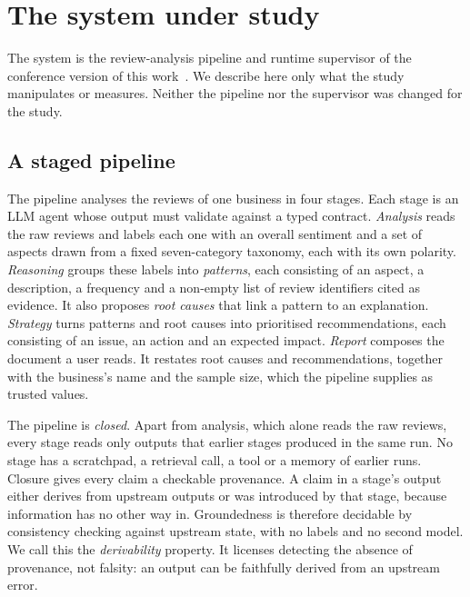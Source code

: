 \section{The system under study}
\label{sec:system}

The system is the review-analysis pipeline and runtime supervisor of the
conference version of this work~\citep{hoang2026eas}. We describe here only what
the study manipulates or measures. Neither the pipeline nor the supervisor was
changed for the study.

\subsection{A staged pipeline}
\label{sec:system-pipeline}

The pipeline analyses the reviews of one business in four stages. Each stage is
an LLM agent whose output must validate against a typed contract.
\emph{Analysis} reads the raw reviews and labels each one with an overall
sentiment and a set of aspects drawn from a fixed seven-category taxonomy,
each with its own polarity. \emph{Reasoning} groups these labels into
\emph{patterns}, each consisting of an aspect, a description, a frequency and
a non-empty list of review identifiers cited as evidence. It also proposes
\emph{root causes} that link a pattern to an explanation. \emph{Strategy} turns
patterns and root causes into prioritised recommendations, each consisting of
an issue, an action and an expected impact. \emph{Report} composes the
document a user reads. It restates root causes and recommendations, together
with the business's name and the sample size, which the pipeline supplies as
trusted values.

The pipeline is \emph{closed}. Apart from analysis, which alone reads the raw
reviews, every stage reads only outputs that earlier stages produced in the
same run. No stage has a scratchpad, a retrieval call, a tool or a memory of
earlier runs. Closure gives every claim a checkable provenance. A claim in a
stage's output either derives from upstream outputs or was introduced by that
stage, because information has no other way in. Groundedness is therefore
decidable by consistency checking against upstream state, with no labels and no
second model. We call this the \emph{derivability} property. It licenses
detecting the absence of provenance, not falsity: an output can be faithfully
derived from an upstream error.

